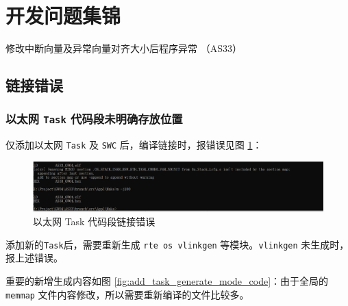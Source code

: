 \section{开发问题集锦}

\begin{introduction}
    \item {}
    \item {}
    \item {}
    \item {}
    \item 修改中断向量及异常向量对齐大小后程序异常 （AS33）
    \item {}
\end{introduction}

\subsection{链接错误}
\subsubsection{以太网 \lstinline{Task} 代码段未明确存放位置}\label{subsubsec:eth_ld_task_error}
仅添加以太网 \lstinline{Task} 及 \lstinline{SWC} 后，编译链接时，报错误见图 \ref{fig:ld_error_eth_task}：

\begin{figure}[htbp]
    \centering
    \includegraphics[scale=0.6]{pic/eth_ld_error_task.png}
    \caption{以太网 Task 代码段链接错误}
    \label{fig:ld_error_eth_task}
\end{figure}

添加新的\lstinline{Task}后，需要重新生成 \lstinline{rte os vlinkgen} 等模块。\lstinline{vlinkgen} 未生成时，报上述错误。

重要的新增生成内容如图 \ref{fig:add_task_generate_mode_code}：由于全局的 \lstinline{memmap} 文件内容修改，所以需要重新编译的文件比较多。

